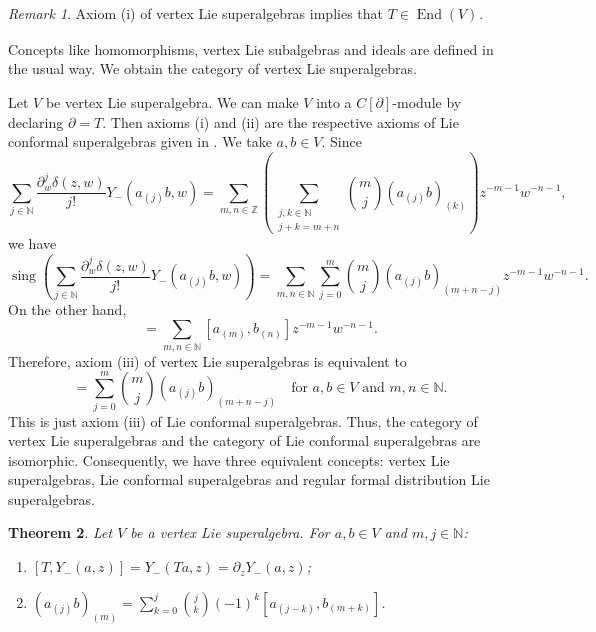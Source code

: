 \documentclass[a4paper, 12pt, reqno]{amsart}
\newtheorem{theorem}{Theorem}[section]
\theoremstyle{remark}
\newtheorem{remark}[theorem]{Remark}
\DeclareMathOperator{\End}{End}
\DeclareMathOperator{\zero}{\overline{0}}
\DeclareMathOperator{\sing}{sing}
\begin{document}
\begin{remark}
  \label{rmk:37}
  Axiom (i) of vertex Lie superalgebras implies that $T \in \End(V)_{\zero}$.
\end{remark}

Concepts like homomorphisms, vertex Lie subalgebras and ideals are defined in the usual way.
We obtain the category of vertex Lie superalgebras.

Let $V$ be vertex Lie superalgebra.
We can make $V$ into a $C[\partial]$-module by declaring $\partial = T$.
Then axioms (i) and (ii) are the respective axioms of Lie conformal superalgebras given in .
We take $a, b \in V$.
Since
\begin{equation*}
  \sum_{j \in \mathbb{N}}\frac{\partial^j_w\delta(z, w)}{j!}Y_-(a_{(j)}b, w) = \sum_{m, n \in \mathbb{Z}}\left(\sum_{\substack{j, k \in \mathbb{N} \\ j + k = m + n}}\binom{m}{j}(a_{(j)}b)_{(k)}\right)z^{-m - 1}w^{-n - 1},
\end{equation*}
we have
\begin{equation*}
  \sing\left(\sum_{j \in \mathbb{N}}\frac{\partial^j_w\delta(z, w)}{j!}Y_-(a_{(j)}b, w)\right) = \sum_{m, n \in \mathbb{N}}\sum_{j = 0}^m\binom{m}{j}(a_{(j)}b)_{(m + n - j)}z^{-m - 1}w^{-n - 1}.
\end{equation*}
On the other hand,
\begin{equation*}
  [Y_-(a, z), Y_-(b, w)] = \sum_{m, n \in \mathbb{N}}[a_{(m)}, b_{(n)}]z^{-m - 1}w^{-n - 1}.
\end{equation*}
Therefore, axiom (iii) of vertex Lie superalgebras is equivalent to
\begin{equation*}
  [a_{(m)}, b_{(n)}] = \sum_{j = 0}^m\binom{m}{j}(a_{(j)}b)_{(m + n - j)} \quad \text{for $a, b \in V$ and $m, n \in \mathbb{N}$}.
\end{equation*}
This is just axiom (iii) of Lie conformal superalgebras.
Thus, the category of vertex Lie superalgebras and the category of Lie conformal superalgebras are isomorphic.
Consequently, we have three equivalent concepts: vertex Lie superalgebras, Lie conformal superalgebras and regular formal distribution Lie superalgebras.

\begin{theorem}
  \label{thr:49}
  Let $V$ be a vertex Lie superalgebra.
  For $a, b \in V$ and $m, j \in \mathbb{N}$:
  \begin{enumerate}
  \item $[T, Y_-(a, z)] = Y_-(Ta, z) = \partial_zY_-(a, z)$;
  \item $(a_{(j)}b)_{(m)} = \sum_{k = 0}^j\binom{j}{k}(-1)^k[a_{(j - k)}, b_{(m + k)}]$.
  \end{enumerate}
\end{theorem}
\end{document}
